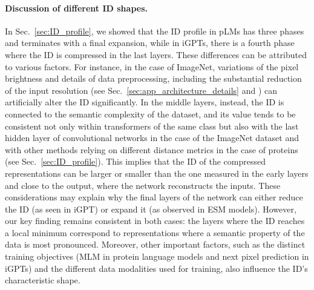 \documentclass{article}
\begin{document}
\paragraph{Discussion of different ID shapes.}
In Sec.~\ref{sec:ID_profile}, we showed that the ID profile in pLMs has three phases and terminates with a final expansion, while in iGPTs, there is a fourth phase where the ID is compressed in the last layers. 
%
These differences can be attributed to various factors. For instance, 
%
in the case of ImageNet, variations of the pixel brightness \cite{ansuini2019intrinsic} and details of data preprocessing, including the substantial reduction of the input resolution (see Sec.~\ref{sec:app_architecture_details} and \cite{igpt}) can artificially alter the ID significantly.
%
In the middle layers, instead, the ID is connected to the semantic complexity of the dataset, and its value tends to be consistent not only within transformers of the same class but also with the last hidden layer of convolutional networks in the case of the ImageNet dataset \cite{ansuini2019intrinsic} and with other methods relying on different distance metrics in the case of proteins \cite{facco2019protein} (see Sec.~\ref{sec:ID_profile}).
%
This implies that the ID of the compressed representations can be larger or smaller than the one measured in the early layers and close to the output, where the network reconstructs the inputs.
%
These considerations may explain why the final layers of the network can either reduce the ID (as seen in iGPT) or expand it (as observed in ESM models).
%
However, our key finding remains consistent in both cases: the layers where the ID reaches a local minimum correspond to
representations where a semantic property of the data is most pronounced.
%
Moreover, other important factors, such as the distinct training objectives (MLM in protein language models and next pixel prediction in iGPTs) and the different data modalities used for training, also influence the ID's characteristic shape.
\end{document}
